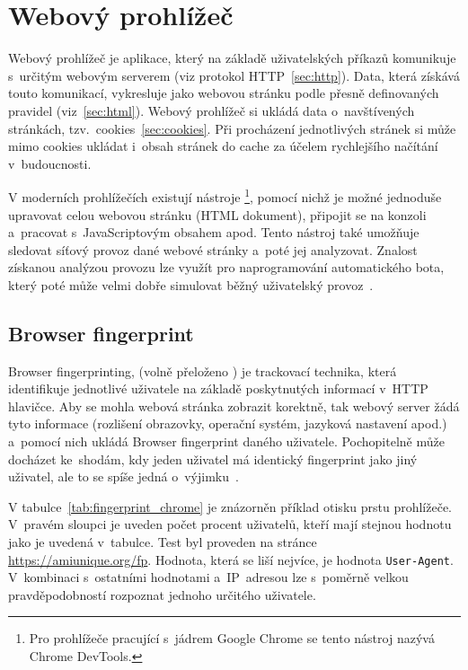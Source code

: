 \section{Webový prohlížeč}
\label{sec:web_browser}
Webový prohlížeč je aplikace, který na základě uživatelských příkazů komunikuje s~určitým webovým serverem (viz protokol HTTP~\ref{sec:http}). Data, která získává touto komunikací, vykresluje jako webovou stránku podle přesně definovaných pravidel (viz~\ref{sec:html}). Webový prohlížeč si ukládá data o~navštívených stránkách, tzv.~cookies~\ref{sec:cookies}. Při procházení jednotlivých stránek si může mimo cookies ukládat i~obsah stránek do cache za účelem rychlejšího načítání v~budoucnosti.

V moderních prohlížečích existují nástroje \footnote{Pro prohlížeče pracující s~jádrem Google Chrome se tento nástroj nazývá Chrome DevTools.}, pomocí nichž je možné jednoduše upravovat celou webovou stránku (HTML dokument), připojit se na konzoli a~pracovat s~JavaScriptovým obsahem apod. Tento nástroj také umožňuje sledovat síťový provoz dané webové stránky a~poté jej analyzovat. Znalost získanou analýzou provozu lze využít pro naprogramování automatického bota, který poté může velmi dobře simulovat běžný uživatelský provoz~\cite{bib:google_inspect}.

\subsection*{Browser fingerprint}
\label{sec:browser_fingerprint}
Browser fingerprinting, (volně přeloženo \textit{}) je trackovací technika, která identifikuje jednotlivé uživatele na základě poskytnutých informací v~HTTP hlavičce. Aby se mohla webová stránka zobrazit korektně, tak webový server žádá tyto informace (rozlišení obrazovky, operační systém, jazyková nastavení apod.) a~pomocí nich ukládá Browser fingerprint daného uživatele. Pochopitelně může docházet ke~shodám, kdy jeden uživatel má identický fingerprint jako jiný uživatel, ale to se spíše jedná o~výjimku~\cite{bib:browser_fingerprint}.

V tabulce~\ref{tab:fingerprint_chrome} je znázorněn příklad otisku prstu prohlížeče. V~pravém sloupci je uveden počet procent uživatelů, kteří mají stejnou hodnotu jako je uvedená v~tabulce. Test byl proveden na stránce \href{https://amiunique.org/fp}{https://amiunique.org/fp}. Hodnota, která se liší nejvíce, je hodnota \texttt{User-Agent}. V~kombinaci s~ostatními hodnotami a~IP~adresou lze s~poměrně velkou pravděpodobností rozpoznat jednoho určitého uživatele.

